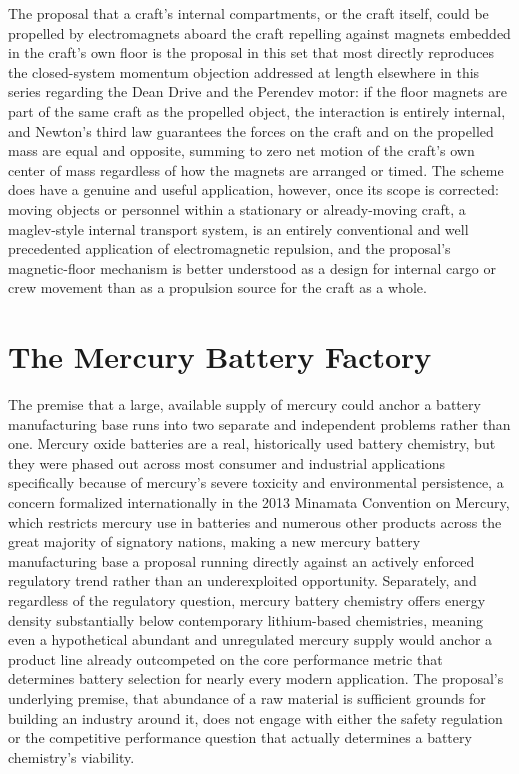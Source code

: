 \documentclass[11pt]{article}
\begin{document}
The proposal that a craft's internal compartments, or the craft itself, could be propelled by electromagnets aboard the craft repelling against magnets embedded in the craft's own floor is the proposal in this set that most directly reproduces the closed-system momentum objection addressed at length elsewhere in this series regarding the Dean Drive and the Perendev motor: if the floor magnets are part of the same craft as the propelled object, the interaction is entirely internal, and Newton's third law guarantees the forces on the craft and on the propelled mass are equal and opposite, summing to zero net motion of the craft's own center of mass regardless of how the magnets are arranged or timed. The scheme does have a genuine and useful application, however, once its scope is corrected: moving objects or personnel within a stationary or already-moving craft, a maglev-style internal transport system, is an entirely conventional and well precedented application of electromagnetic repulsion, and the proposal's magnetic-floor mechanism is better understood as a design for internal cargo or crew movement than as a propulsion source for the craft as a whole.

\section{The Mercury Battery Factory}

The premise that a large, available supply of mercury could anchor a battery manufacturing base runs into two separate and independent problems rather than one. Mercury oxide batteries are a real, historically used battery chemistry, but they were phased out across most consumer and industrial applications specifically because of mercury's severe toxicity and environmental persistence, a concern formalized internationally in the 2013 Minamata Convention on Mercury, which restricts mercury use in batteries and numerous other products across the great majority of signatory nations, making a new mercury battery manufacturing base a proposal running directly against an actively enforced regulatory trend rather than an underexploited opportunity. Separately, and regardless of the regulatory question, mercury battery chemistry offers energy density substantially below contemporary lithium-based chemistries, meaning even a hypothetical abundant and unregulated mercury supply would anchor a product line already outcompeted on the core performance metric that determines battery selection for nearly every modern application. The proposal's underlying premise, that abundance of a raw material is sufficient grounds for building an industry around it, does not engage with either the safety regulation or the competitive performance question that actually determines a battery chemistry's viability.
\end{document}
